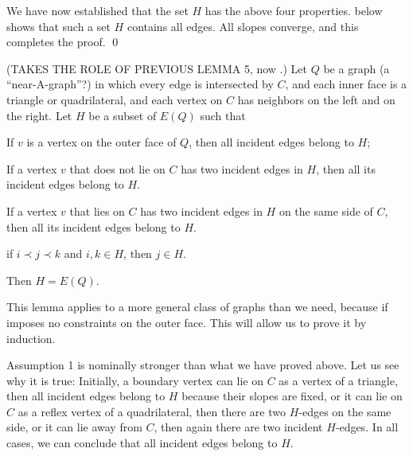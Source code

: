 We have now established that the set $H$ has
 the above four properties.
    below shows that such a set
   $H$ contains all edges. All slopes converge, and this 
   completes the proof.
\qed%


\begin{lem}
(TAKES THE ROLE OF PREVIOUS LEMMA 5, now .)
  Let $Q$ be a graph (a ``near-A-graph''?) in which every edge is intersected
  by $C$, and each inner face is a triangle or quadrilateral, and each
  vertex on $C$ has neighbors on the left and on the right.  Let $H$
  be a subset of $E(Q)$ such that
   \begin{compactenum}
    \item If $v$ is a vertex on the outer face 
      of $Q$, then all incident edges belong to $H$;
    \item
If a vertex $v$ that does not lie on $C$ has two incident edges in
$H$,
then all its incident edges belong to $H$.
    \item
If a vertex $v$ that lies on $C$ has two incident edges in
$H$ on the same side of $C$,
then all its incident edges belong to $H$.
    \item if $i \prec j \prec k$ and $i,k\in H$, 
      then $j\in H$.
   \end{compactenum}
   Then $H=E(Q)$.
\end{lem}

This lemma applies to a more general class of graphs than we
need,
because if imposes no constraints on the outer face.
This will allow us to prove it by induction.

 Assumption 1 is nominally stronger than what we have proved above.
Let us see why it is true: Initially, a boundary vertex
 can
lie on $C$ as a vertex of a triangle, then all incident edges belong to $H$ because their slopes
are fixed,
or it
 can
lie on $C$ as a reflex vertex of a quadrilateral, then there are two
$H$-edges on the same side,
or it can
lie away from $C$, then again there are two
incident $H$-edges.
In all cases, we can conclude that all incident edges belong to $H$.


